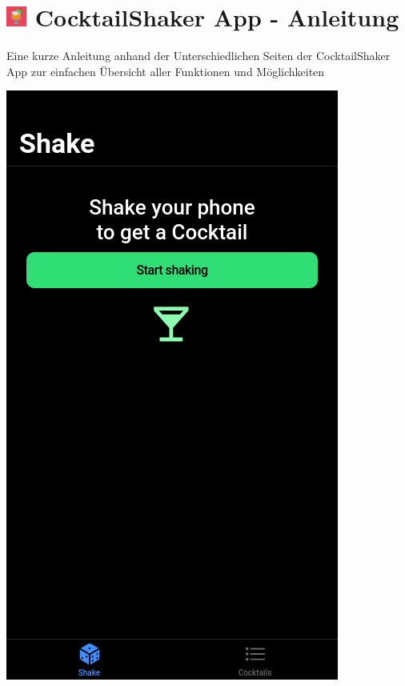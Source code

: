 \documentclass[a4paper, 10pt]{article}
\begin{document}
\section*{\centering \includegraphics[width=25px]{icon.png} CocktailShaker App - Anleitung}

\vspace{\baselineskip}

Eine kurze Anleitung anhand der Unterschiedlichen Seiten der CocktailShaker App zur einfachen Übersicht aller Funktionen und Möglichkeiten

\bigskip

\begin{multicols}{4}
    \begin{center}
        \includegraphics[width=.8\linewidth]{Start.png}
    \end{center}
    \columnbreak

\end{multicols}
\end{document}
